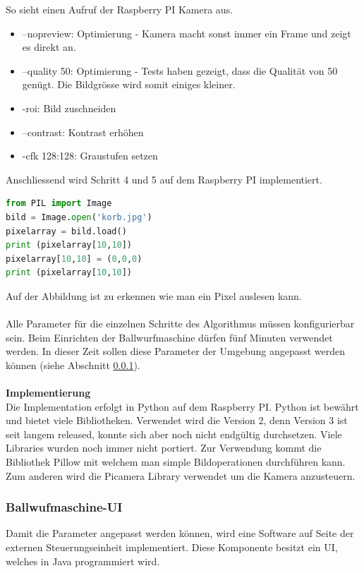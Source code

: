 So sieht einen Aufruf der Raspberry PI Kamera aus. 
\begin{itemize}
	\item --nopreview: Optimierung - Kamera macht sonst immer ein Frame und zeigt es direkt an.
	\item --quality 50: Optimierung - Tests haben gezeigt, dass die Qualität von 50 genügt. Die Bildgrösse wird somit einiges kleiner.
	\item -roi: Bild zuschneiden
	\item --contrast: Kontrast erhöhen
	\item -cfk 128:128: Graustufen setzen
\end{itemize} 

Anschliessend wird Schritt 4 und 5 auf dem Raspberry PI implementiert. 

\begin{lstlisting}[language=Python]
from PIL import Image
bild = Image.open('korb.jpg')
pixelarray = bild.load()
print (pixelarray[10,10])
pixelarray[10,10] = (0,0,0)
print (pixelarray[10,10])
\end{lstlisting}

Auf der Abbildung ist zu erkennen wie man ein Pixel auslesen kann.\\
\\
Alle Parameter für die einzelnen Schritte des Algorithmus müssen konfigurierbar sein. Beim Einrichten der Ballwurfmaschine dürfen fünf Minuten verwendet werden. In dieser Zeit sollen diese Parameter der Umgebung angepasst werden können (siehe Abschnitt \ref{ss-config-paramater-ortung-orb}).\\
\\
\textbf{Implementierung}\\
Die Implementation erfolgt in Python auf dem Raspberry PI. Python ist bewährt und bietet viele Bibliotheken. Verwendet wird die Version 2, denn Version 3 ist seit langem released, konnte sich aber noch nicht endgültig durchsetzen. Viele Libraries wurden noch immer nicht portiert. Zur Verwendung kommt die Bibliothek Pillow mit welchem man simple Bildoperationen durchführen kann. Zum anderen wird die Picamera Library verwendet um die Kamera anzusteuern.

\subsubsection{Ballwufmaschine-UI}
\label{ss-config-paramater-ortung-orb}
Damit die Parameter angepasst werden können, wird eine Software auf Seite der externen Steuerungseinheit implementiert. Diese Komponente besitzt ein UI, welches in Java programmiert wird.

